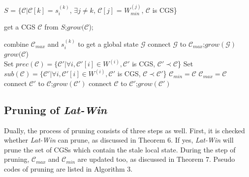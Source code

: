 \documentclass[12pt,journal,letterpaper,compsoc]{IEEEtran}
\begin{document}
\begin{algorithm}[htbp]
\SetAlgoVlined
{}
{
    $S$ = $\{\mathcal{C}|\mathcal{C}[k]$ = $s^{(k)}_i$, $\exists j\neq k$, $\mathcal{C}[j]$ = $W^{(j)}_{min}$, $\mathcal{C}$ is CGS\}\;
     {
        get a CGS $\mathcal{C}$ from $S$;\hspace{0.05in}$grow(\mathcal{C}$);

    }
}
{
    combine $\mathcal{C}_{max}$ and $s^{(k)}_{i}$ to get a global state $\mathcal{G}$\;
    {
        connect $\mathcal{G}$ to $\mathcal{C}_{max}$;\hspace{0.05in}$grow(\mathcal{G})$\;
    }
}
\vspace{0.3cm}
$grow(\mathcal{C}$)\\
Set $prec(\mathcal{C}) = \{\mathcal{C}'|\forall i, \mathcal{C}'[i]\in W^{(i)}, \mathcal{C}'$ is CGS, $\mathcal{C}'\prec \mathcal{C}$\}\;
Set $sub(\mathcal{C}) = \{\mathcal{C}'|\forall i, \mathcal{C}'[i]\in W^{(i)}, \mathcal{C}'$ is CGS, $\mathcal{C}\prec \mathcal{C}'$\}\;
{
    $\mathcal{C}_{min} = \mathcal{C}$\;
}
{
    $\mathcal{C}_{max} = \mathcal{C}$\;
}
{
    {
        connect $\mathcal{C}'$ to $\mathcal{C}$;\hspace{0.05in}$grow(\mathcal{C}')$\;
    }
}
{
    {
        connect $\mathcal{C}$ to $\mathcal{C}'$;\hspace{0.05in}$grow(\mathcal{C}')$\;
    }
}
\caption{$grow\_lattice(s^{(k)}_i, k)$\label{A:grow_lattice($s^{(k)}_i, k$)}}
\end{algorithm}

\subsection{Pruning of {\it Lat-Win}}

Dually, the process of pruning consists of three steps as well. First, it is checked whether {\it Lat-Win} can prune, as discussed in Theorem 6. If yes, {\it Lat-Win} will prune the set of CGSs which contain the stale local state. During the step of pruning, $\mathcal{C}_{max}$ and $\mathcal{C}_{min}$ are updated too, as discussed in Theorem 7. Pseudo codes of pruning are listed in Algorithm 3.
\end{document}
